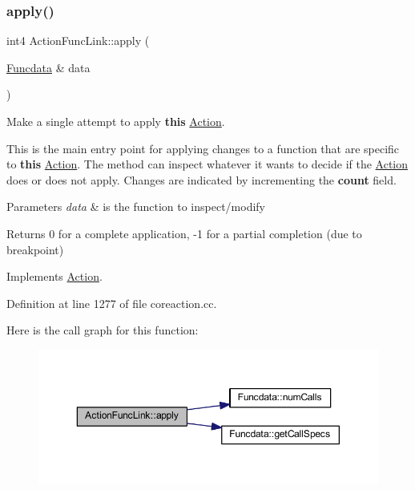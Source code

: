 \subsubsection{\texorpdfstring{apply()}{apply()}}
{\footnotesize\ttfamily int4 Action\+Func\+Link\+::apply (\begin{DoxyParamCaption}\item[{\mbox{\hyperlink{class_funcdata}{Funcdata}} \&}]{data }\end{DoxyParamCaption})\hspace{0.3cm}{\ttfamily [virtual]}}



Make a single attempt to apply {\bfseries{this}} \mbox{\hyperlink{class_action}{Action}}. 

This is the main entry point for applying changes to a function that are specific to {\bfseries{this}} \mbox{\hyperlink{class_action}{Action}}. The method can inspect whatever it wants to decide if the \mbox{\hyperlink{class_action}{Action}} does or does not apply. Changes are indicated by incrementing the {\bfseries{count}} field. 
\begin{DoxyParams}{Parameters}
{\em data} & is the function to inspect/modify \\
\hline
\end{DoxyParams}
\begin{DoxyReturn}{Returns}
0 for a complete application, -\/1 for a partial completion (due to breakpoint) 
\end{DoxyReturn}


Implements \mbox{\hyperlink{class_action_aac1c3999d6c685b15f5d9765a4d04173}{Action}}.



Definition at line 1277 of file coreaction.\+cc.

Here is the call graph for this function\+:
\nopagebreak
\begin{figure}[H]
\begin{center}
\leavevmode
\includegraphics[width=350pt]{class_action_func_link_aea1b5a423e2affec2131468fc23a6a3e_cgraph}
\end{center}
\end{figure}
\mbox{\label{class_action_func_link_a58d93701c5e89f1128b0b4e0f770f56a}} 
